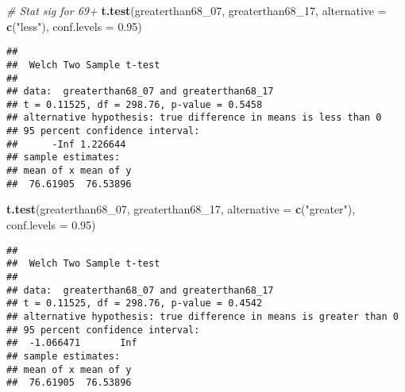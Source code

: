 \documentclass[
]{article}
\newenvironment{Shaded}{\begin{snugshade}}{\end{snugshade}}
\newcommand{\AttributeTok}[1]{\textcolor[rgb]{0.13,0.29,0.53}{#1}}
\newcommand{\CommentTok}[1]{\textcolor[rgb]{0.56,0.35,0.01}{\textit{#1}}}
\newcommand{\FloatTok}[1]{\textcolor[rgb]{0.00,0.00,0.81}{#1}}
\newcommand{\FunctionTok}[1]{\textcolor[rgb]{0.13,0.29,0.53}{\textbf{#1}}}
\newcommand{\NormalTok}[1]{#1}
\newcommand{\StringTok}[1]{\textcolor[rgb]{0.31,0.60,0.02}{#1}}
\begin{document}
\begin{Shaded}
\begin{Highlighting}[]
\CommentTok{\# Stat sig for 69+}
\FunctionTok{t.test}\NormalTok{(greaterthan68\_07, greaterthan68\_17, }\AttributeTok{alternative =} \FunctionTok{c}\NormalTok{(}\StringTok{"less"}\NormalTok{),}
       \AttributeTok{conf.levels =} \FloatTok{0.95}\NormalTok{)}
\end{Highlighting}
\end{Shaded}

\begin{verbatim}
## 
##  Welch Two Sample t-test
## 
## data:  greaterthan68_07 and greaterthan68_17
## t = 0.11525, df = 298.76, p-value = 0.5458
## alternative hypothesis: true difference in means is less than 0
## 95 percent confidence interval:
##      -Inf 1.226644
## sample estimates:
## mean of x mean of y 
##  76.61905  76.53896
\end{verbatim}

\begin{Shaded}
\begin{Highlighting}[]
\FunctionTok{t.test}\NormalTok{(greaterthan68\_07, greaterthan68\_17, }\AttributeTok{alternative =} \FunctionTok{c}\NormalTok{(}\StringTok{"greater"}\NormalTok{),}
       \AttributeTok{conf.levels =} \FloatTok{0.95}\NormalTok{)}
\end{Highlighting}
\end{Shaded}

\begin{verbatim}
## 
##  Welch Two Sample t-test
## 
## data:  greaterthan68_07 and greaterthan68_17
## t = 0.11525, df = 298.76, p-value = 0.4542
## alternative hypothesis: true difference in means is greater than 0
## 95 percent confidence interval:
##  -1.066471       Inf
## sample estimates:
## mean of x mean of y 
##  76.61905  76.53896
\end{verbatim}
\end{document}
